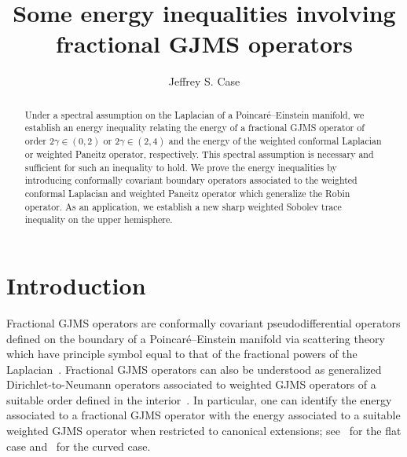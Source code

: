 \documentclass{amsart}
\theoremstyle{definition}
\theoremstyle{remark}
\numberwithin{equation}{section}
\begin{document}
\title{Some energy inequalities involving fractional GJMS operators}
\author{Jeffrey S. Case}
\address{109 McAllister Building \\ Penn State University \\ University Park, PA 16802}
\begin{abstract}
Under a spectral assumption on the Laplacian of a Poincar\'e--Einstein manifold, we establish an energy inequality relating the energy of a fractional GJMS operator of order $2\gamma\in(0,2)$ or $2\gamma\in(2,4)$ and the energy of the weighted conformal Laplacian or weighted Paneitz operator, respectively.  This spectral assumption is necessary and sufficient for such an inequality to hold.  We prove the energy inequalities by introducing conformally covariant boundary operators associated to the weighted conformal Laplacian and weighted Paneitz operator which generalize the Robin operator.  As an application, we establish a new sharp weighted Sobolev trace inequality on the upper hemisphere.
\end{abstract}
\maketitle

\section{Introduction}
\label{sec:intro}

Fractional GJMS operators are conformally covariant pseudodifferential operators defined on the boundary of a Poincar\'e--Einstein manifold via scattering theory which have principle symbol equal to that of the fractional powers of the Laplacian~\cite{GrahamZworski2003}.  Fractional GJMS operators can also be understood as generalized Dirichlet-to-Neumann operators associated to weighted GJMS operators of a suitable order defined in the interior~\cite{CaffarelliSilvestre2007,CaseChang2013,ChangGonzalez2011,Yang2013}.  In particular, one can identify the energy associated to a fractional GJMS operator with the energy associated to a suitable weighted GJMS operator when restricted to canonical extensions; see~\cite{CaffarelliSilvestre2007,Yang2013} for the flat case and~\cite{CaseChang2013,ChangGonzalez2011} for the curved case.
\end{document}
